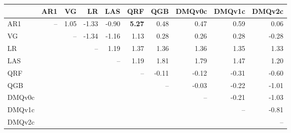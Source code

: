 \begin{tabular}{lrrrrrrrrr}
\toprule
 & AR1 & VG & LR & LAS & QRF & QGB & DMQv0c & DMQv1c & DMQv2c \\
\midrule
AR1 & -- & 1.05 & -1.33 & -0.90 & \textbf{5.27} & 0.48 & 0.47 & 0.59 & 0.06 \\
VG &  & -- & -1.34 & -1.16 & 1.13 & 0.28 & 0.26 & 0.28 & -0.28 \\
LR &  &  & -- & 1.19 & 1.37 & 1.36 & 1.36 & 1.35 & 1.33 \\
LAS &  &  &  & -- & 1.19 & 1.81 & 1.79 & 1.47 & 1.20 \\
QRF &  &  &  &  & -- & -0.11 & -0.12 & -0.31 & -0.60 \\
QGB &  &  &  &  &  & -- & -0.03 & -0.22 & -1.01 \\
DMQv0c &  &  &  &  &  &  & -- & -0.21 & -1.03 \\
DMQv1c &  &  &  &  &  &  &  & -- & -0.81 \\
DMQv2c &  &  &  &  &  &  &  &  & -- \\
\bottomrule
\end{tabular}
